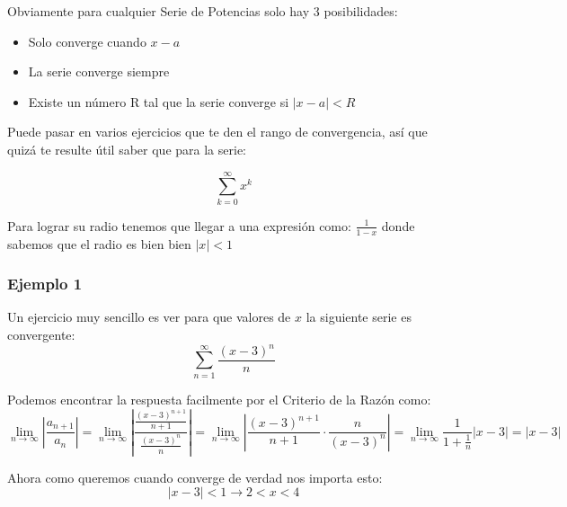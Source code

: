 \documentclass[12pt]{report}                                %
\begin{document}
        Obviamente para cualquier Serie de Potencias solo hay 3 posibilidades:
        \begin{itemize}
            \item Solo converge cuando $x-a$
            \item La serie converge siempre
            \item Existe un número R tal que la serie converge si $|x-a|<R$
        \end{itemize}

        Puede pasar en varios ejercicios que te den el rango de convergencia, así que quizá
        te resulte útil saber que para la serie:

        \begin{equation*}
            \sum_{k=0}^{\infty} x^k
        \end{equation*}

        Para lograr su radio tenemos que llegar a una expresión como: $\frac{1}{1-x}$
        donde sabemos que el radio es bien bien $|x|<1$

        \clearpage
        \subsubsection{Ejemplo 1}
            Un ejercicio muy sencillo es ver para que valores de $x$
            la siguiente serie es convergente:
            \begin{equation*}
               \sum_{n=1}^\infty \frac{(x-3)^n}{n}
            \end{equation*}

            Podemos encontrar la respuesta facilmente por el Criterio de la Razón como:
            \begin{equation*}
                \lim_{n \to \infty} \left| \frac{a_{n+1}}{a_n} \right| = 
                \lim_{n \to \infty} \left| \frac{\frac{(x-3)^{n+1}}{n+1}}{\frac{(x-3)^n}{n}} \right| = 
                \lim_{n \to \infty} \left| \frac{(x-3)^{n+1}}{n+1} \cdot \frac{n}{(x-3)^{n}} \right| =
                \lim_{n \to \infty} \frac{1}{1+\frac{1}{n}} |x-3| =
                |x-3|
            \end{equation*}

            Ahora como queremos cuando converge de verdad nos importa esto:
            \begin{equation*}
                |x-3| < 1 \to 2 < x < 4
            \end{equation*}
\end{document}

